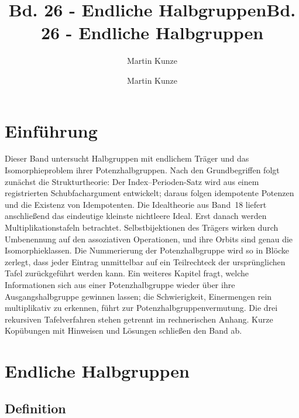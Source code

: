 \documentclass[main.tex]{subfiles}
\title{Bd. 26 - Endliche Halbgruppen}
\author{Martin Kunze}
\date{}
\begin{document}
\title{Bd. 26 - Endliche Halbgruppen}
\author{Martin Kunze}
\date{}
\hypersetup{pageanchor=false}
\maketitle
\hypersetup{pageanchor=true}
\setcounter{tocdepth}{3}
\tableofcontents
\setcounter{file}{26}
\renewcommand{\FormulaBandID}{26}

\chapter{Einführung}

Dieser Band untersucht Halbgruppen mit endlichem Träger und das
Isomorphieproblem ihrer Potenzhalbgruppen.  Nach den Grundbegriffen folgt
zunächst die Strukturtheorie: Der Index--Perioden-Satz wird aus einem
registrierten Schubfachargument entwickelt; daraus folgen idempotente
Potenzen und die Existenz von Idempotenten.  Die Idealtheorie aus Band~18
liefert anschließend das eindeutige kleinste nichtleere Ideal.  Erst danach
werden Multiplikationstafeln betrachtet.  Selbstbijektionen des Trägers
wirken durch Umbenennung auf den assoziativen Operationen, und ihre Orbits
sind genau die Isomorphieklassen.  Die Nummerierung der Potenzhalbgruppe wird
so in Blöcke zerlegt, dass jeder Eintrag unmittelbar auf ein Teilrechteck
der ursprünglichen Tafel zurückgeführt werden kann.  Ein weiteres Kapitel
fragt, welche Informationen sich aus einer Potenzhalbgruppe wieder über
ihre Ausgangshalbgruppe gewinnen lassen; die Schwierigkeit, Einermengen rein
multiplikativ zu erkennen, führt zur Potenzhalbgruppenvermutung.  Die drei
rekursiven Tafelverfahren stehen getrennt im rechnerischen Anhang.  Kurze
Kopübungen mit Hinweisen und Lösungen schließen den Band ab.

\chapter{Endliche Halbgruppen}

\section{Definition}

\end{document}
